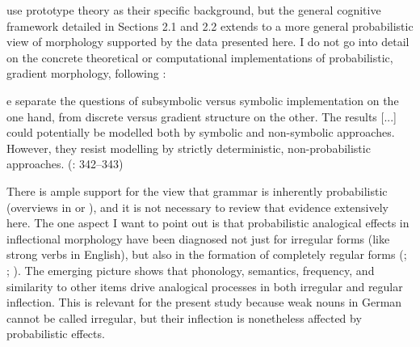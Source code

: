 \begin{styleMoutonText}
\citet{NessetJanda2010} use prototype theory as their specific background, but the general cognitive framework detailed in Sections 2.1 and 2.2 extends to a more general probabilistic view of morphology supported by the data presented here. I do not go into detail on the concrete theoretical or computational implementations of probabilistic, gradient morphology, following \citet{HayBaayen2005}:
\end{styleMoutonText}

\begin{styleMoutonQuote}
[...W]e separate the questions of subsymbolic versus symbolic implementation on the one hand, from discrete versus gradient structure on the other. The results [...] could potentially be modelled both by symbolic and non-symbolic approaches. However, they resist modelling by strictly deterministic, non-probabilistic approaches. (\citealt{HayBaayen2005}: 342–343)
\end{styleMoutonQuote}

\begin{styleMoutonText}
There is ample support for the view that grammar is inherently probabilistic (overviews in \citealt{HayBaayen2005} or \citealt{Kapatsinski2014}), and it is not necessary to review that evidence extensively here. The one aspect I want to point out is that probabilistic analogical effects in inflectional morphology have been diagnosed not just for irregular forms (like strong verbs in English), but also in the formation of completely regular forms (\citealt{ErnestusBaayen2004}; \citealt{TabakEtAl2010}; \citealt{RamscarEtAl2013}). The emerging picture shows that phonology, semantics, frequency, and similarity to other items drive analogical processes in both irregular and regular inflection. This is relevant for the present study because weak nouns in German cannot be called irregular, but their inflection is nonetheless affected by probabilistic effects.
\end{styleMoutonText}

